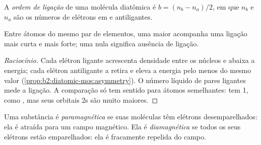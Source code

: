\begin{definition}\label{def:b2:diatomic-mos:bond-order}
A \emph{ordem de ligação} de uma molécula diatômica é $b = (n_b -
n_a)/2$, em que $n_b$ e $n_a$ são os números de elétrons em  e
antiligantes.
\end{definition}

\begin{proposition}\label{prop:b2:diatomic-mos:bond-order}
Entre átomos do mesmo par de elementos, uma  maior acompanha
uma ligação mais curta e mais forte; uma  nula significa
ausência de ligação.
\end{proposition}

\begin{proof}[Raciocínio]
Cada elétron ligante acrescenta densidade entre os núcleos e abaixa a energia;
cada elétron antiligante a retira e eleva a energia pelo menos do mesmo valor
(\cref{prop:b2:diatomic-mos:asymmetry}). O número líquido de pares ligantes
mede a ligação. A comparação só tem sentido para átomos semelhantes: 
tem  1, como , mas seus orbitais 2s são muito maiores.
\end{proof}

\begin{definition}\label{def:b2:diatomic-mos:magnetism}
Uma substância é \emph{paramagnética} se suas moléculas têm
elétrons desemparelhados: ela é atraída para um campo magnético. Ela é
\emph{diamagnética} se todos os seus elétrons estão emparelhados:
ela é fracamente repelida do campo.
\end{definition}

